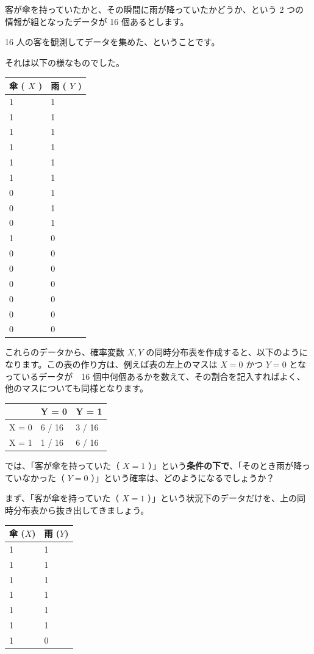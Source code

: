 客が傘を持っていたかと、その瞬間に雨が降っていたかどうか、という 2 つの情報が組となったデータが 16 個あるとします。

16 人の客を観測してデータを集めた、ということです。

それは以下の様なものでした。


\begin{center}
\begin{tabular}{|l|l|}
\hline
傘 ( $X$ ) & 雨 ( $Y$ ) \\
\hline
1 & 1 \\
1 & 1 \\
1 & 1 \\
1 & 1 \\
1 & 1 \\
1 & 1 \\
0 & 1 \\
0 & 1 \\
0 & 1 \\
1 & 0 \\
0 & 0 \\
0 & 0 \\
0 & 0 \\
0 & 0 \\
0 & 0 \\
0 & 0 \\
\hline
\end{tabular}
\end{center}


これらのデータから、確率変数 $X, Y$ の同時分布表を作成すると、以下のようになります。この表の作り方は、例えば表の左上のマスは $X = 0$ かつ $Y = 0$ となっているデータが　16 個中何個あるかを数えて、その割合を記入すればよく、他のマスについても同様となります。


\begin{center}
\begin{tabular}{|l|l|l|}
\hline
$\ $ & Y = 0 & Y = 1 \\
\hline
X = 0 & 6 / 16 & 3 / 16 \\
X = 1 & 1 / 16 & 6 / 16 \\
\hline
\end{tabular}
\end{center}


では、「客が傘を持っていた（ $X = 1$ ）」という\textbf{条件の下で}、「そのとき雨が降っていなかった（ $Y = 0$ ）」という確率は、どのようになるでしょうか？


まず、「客が傘を持っていた（ $X = 1$ ）」という状況下のデータだけを、上の同時分布表から抜き出してきましょう。


\begin{center}
\begin{tabular}{|l|l|}
\hline
傘 ($X$) & 雨 ($Y$) \\
\hline
1 & 1 \\
1 & 1 \\
1 & 1 \\
1 & 1 \\
1 & 1 \\
1 & 1 \\
1 & 0 \\
\hline
\end{tabular}
\end{center}


